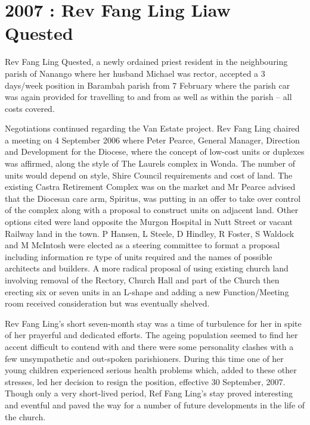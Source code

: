 \hypertarget{rev-fang-ling-liaw-quested}{%
\section{2007 : Rev Fang Ling Liaw Quested}\label{rev-fang-ling-liaw-quested}}

Rev Fang Ling Quested, a newly ordained priest resident in the neighbouring parish of Nanango where her husband Michael was rector, accepted a 3 days/week position in Barambah parish from 7 February where the parish car was again provided for travelling to and from as well as within the parish -- all costs covered.

Negotiations continued regarding the Van Estate project. Rev Fang Ling chaired a meeting on 4 September 2006 where Peter Pearce, General Manager, Direction and Development for the Diocese, where the concept of low-cost units or duplexes was affirmed, along the style of The Laurels complex in Wonda. The number of units would depend on style, Shire Council requirements and cost of land. The existing Castra Retirement Complex was on the market and Mr Pearce advised that the Diocesan care arm, Spiritus, was putting in an offer to take over control of the complex along with a proposal to construct units on adjacent land. Other options cited were land opposite the Murgon Hospital in Nutt Street or vacant Railway land in the town. P Hansen, L Steele, D Hindley, R Foster, S Waldock and M McIntosh were elected as a steering committee to format a proposal including information re type of units required and the names of possible architects and builders. A more radical proposal of using existing church land involving removal of the Rectory, Church Hall and part of the Church then erecting six or seven units in an L-shape and adding a new Function/Meeting room received consideration but was eventually shelved.

Rev Fang Ling's short seven-month stay was a time of turbulence for her in spite of her prayerful and dedicated efforts. The ageing population seemed to find her accent difficult to contend with and there were some personality clashes with a few unsympathetic and out-spoken parishioners. During this time one of her young children experienced serious health problems which, added to these other stresses, led her decision to resign the position, effective 30 September, 2007. Though only a very short-lived period, Ref Fang Ling's stay proved interesting and eventful and paved the way for a number of future developments in the life of the church.

